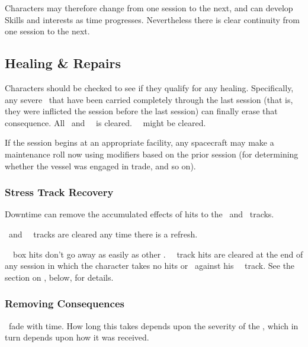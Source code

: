 Characters may therefore change from one session to the next, and can develop Skills and interests as time progresses. Nevertheless there is clear continuity from one session to the next.

\subsection{Healing \& Repairs}
\label{sec:healing-and-repairs}

Characters should be checked to see if they qualify for any healing. Specifically, any severe \Consequences\ that have been carried completely through the last session (that is, they were inflicted the session before the last session) can finally erase that consequence. All \Health\ and \Composure\ \Stress\ is cleared. \Wealth\ \Stress\ might be cleared.

If the session begins at an appropriate facility, any spacecraft may make a maintenance roll now using modifiers based on the prior session (for determining whether the vessel was engaged in trade, and so on).

\subsubsection{Stress Track Recovery}
\label{sec:Stress Track Recovery}

Downtime can remove the accumulated effects of hits to the \Health\ and \Composure\ tracks.

\Health\ and \Composure\ \Stress\ tracks are cleared any time there is a refresh.

\Wealth\ \Stress\ box hits don't go away as easily as other \Stress.
\Wealth\ \Stress\ track hits are cleared at the end of any session in which the character takes no hits or \Consequences\ against his \Wealth\ \Stress\ track. See the section on , below, for details.



\subsubsection{Removing Consequences}
\label{sec:Removing Consequences}

\Consequences\ fade with time. How long this takes depends upon the severity of the \Consequence, which in turn depends upon how it was received.

